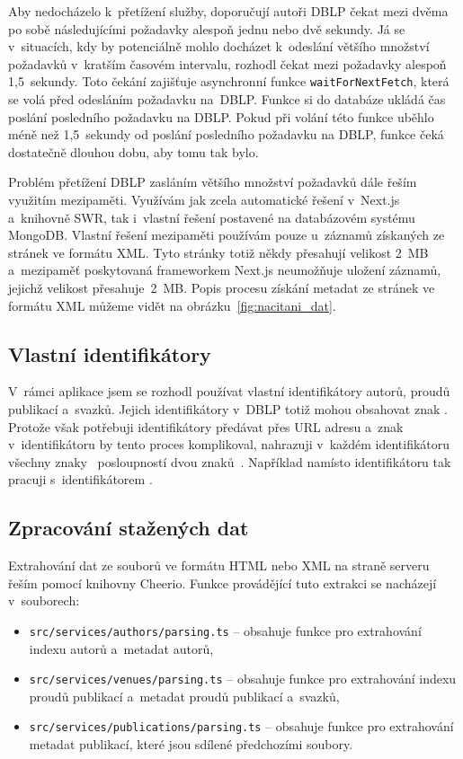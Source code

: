 \documentclass[
  biblatex,
  sourcecodes,
  glossaries,
  index
]{kidiplom}
\begin{document}
Aby nedocházelo k~přetížení služby, doporučují autoři DBLP čekat mezi dvěma po sobě následujícími požadavky alespoň jednu nebo dvě sekundy. Já se v~situacích, kdy by potenciálně mohlo docházet k~odeslání většího množství požadavků v~kratším časovém intervalu, rozhodl čekat mezi požadavky alespoň 1,5~sekundy. Toto čekání zajišťuje asynchronní funkce \texttt{waitForNextFetch}, která se volá před odesláním požadavku na~DBLP. Funkce si do databáze ukládá čas poslání posledního požadavku na DBLP. Pokud při volání této funkce uběhlo méně než 1,5~sekundy od poslání posledního požadavku na DBLP, funkce čeká dostatečně dlouhou dobu, aby tomu tak bylo.

Problém přetížení DBLP zasláním většího množství požadavků dále řeším využitím mezipaměti. Využívám jak zcela automatické řešení v~Next.js a~knihovně SWR, tak i~vlastní řešení postavené na databázovém systému MongoDB. Vlastní řešení mezipaměti používám pouze u~záznamů získaných ze stránek ve formátu XML. Tyto stránky totiž někdy přesahují velikost 2~MB a~mezipaměť poskytovaná frameworkem Next.js neumožňuje uložení záznamů, jejichž velikost přesahuje~2~MB. Popis procesu získání metadat ze stránek ve formátu XML můžeme vidět na obrázku~\ref{fig:nacitani_dat}.

\subsection{Vlastní identifikátory}

V~rámci aplikace jsem se rozhodl používat vlastní identifikátory autorů, proudů publikací a~svazků. Jejich identifikátory v~DBLP totiž mohou obsahovat znak \uv{/}. Protože však potřebuji identifikátory předávat přes URL adresu a~znak~\uv{/} v~identifikátoru by tento proces komplikoval, nahrazuji v~každém identifikátoru všechny znaky~\uv{/} posloupností dvou znaků~\uv{\_}. Například namísto identifikátoru  tak pracuji s~identifikátorem .

\subsection{Zpracování stažených dat}

Extrahování dat ze souborů ve formátu HTML nebo XML na straně serveru řeším pomocí knihovny Cheerio. Funkce provádějící tuto extrakci se nacházejí v~souborech:

\begin{itemize}
\item \texttt{src/services/authors/parsing.ts} -- obsahuje funkce pro extrahování indexu autorů a~metadat autorů,
\item \texttt{src/services/venues/parsing.ts} -- obsahuje funkce pro extrahování indexu proudů publikací a~metadat proudů publikací a~svazků,
\item \texttt{src/services/publications/parsing.ts} -- obsahuje funkce pro extrahování metadat publikací, které jsou sdílené předchozími soubory.
\end{itemize}
\end{document}
